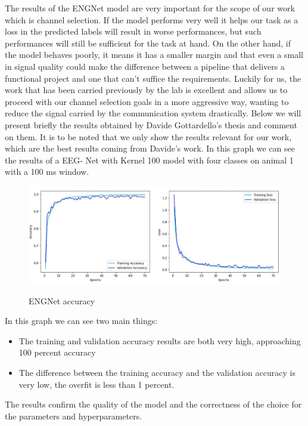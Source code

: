 \documentclass{Configuration_Files/PoliMi3i_thesis}
\begin{document}
The results of the ENGNet model are very important for the scope of our work which is channel selection.
If the model performs very well it helps our task as a loss in the predicted labels will result in worse performances, but such performances will still be sufficient for the task at hand.
On the other hand, if the model behaves poorly, it means it has a smaller margin and that even a small in signal quality could make the difference between a pipeline that delivers a functional project and one that can't suffice the requirements.
Luckily for us, the work that has been carried previously by the lab is excellent and allows us to proceed with our channel selection goals in a more aggressive way, wanting to reduce the signal carried by the communication system drastically.
Below we will present briefly the results obtained by Davide Gottardello's thesis and comment on them.
It is to be noted that we only show the results relevant for our work, which are the best results coming from Davide's work.
In this graph we can see the results of a EEG- Net with Kernel 100 model with four classes on animal 1 with a 100 ms window.
\begin{figure}[H]
	\includegraphics[scale=0.5]{trainingAccuracyDavide.png}
	\centering
    \label{engNet_params_4}

    \caption{ENGNet accuracy}
	\end{figure}


In this graph we can see two main things:
\begin{itemize}
    \item The training and validation accuracy results are both very high, approaching 100 percent accuracy
    \item The difference between the training accuracy and the validation accuracy is very low, the overfit is less than 1 percent.
\end{itemize}

The results confirm the quality of the model and the correctness of the choice for the parameters and hyperparameters.
\end{document}
